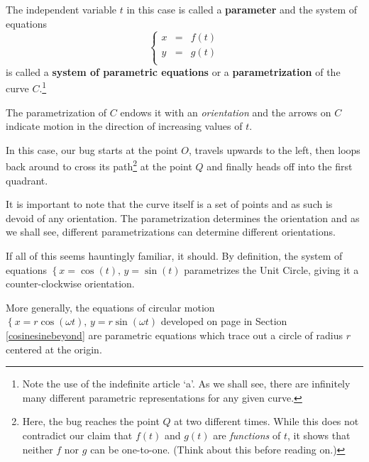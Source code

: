 \documentclass{ximera}
\begin{document}
\smallskip

The independent variable $t$ in this case is called a  \textbf{parameter} and the system of equations \[\left\{ \begin{array}{rcl} x & = & f(t) \\ y & = & g(t) \\ \end{array} \right.\] is called a  \textbf{system of parametric equations} or a  \textbf{parametrization} of the curve $C$.\footnote{Note the use of the indefinite article `a'.  As we shall see, there are infinitely many different parametric representations for any given curve.}   

\smallskip

The parametrization of $C$ endows it with an  \textit{orientation} and the arrows on $C$ indicate motion in the direction of increasing values of $t$. 

\smallskip

In this case, our bug starts at the point $O$, travels upwards to the left, then loops back around to cross its path\footnote{Here, the bug reaches the point $Q$ at two different times. While this does not contradict our claim that $f(t)$ and $g(t)$ are \textit{functions} of $t$, it shows that neither $f$ nor $g$ can be one-to-one.  (Think about this before reading on.)} at the point $Q$ and finally heads off into the first quadrant. 

\smallskip

  It is important to note that the curve itself is a set of points and as such is devoid of any orientation.  The parametrization determines the orientation and as we shall see, different parametrizations can determine different orientations. 
  
  \smallskip
  
  If all of this seems hauntingly familiar, it should.  By definition, the system of equations $\left\{ x = \cos(t), \, y = \sin(t) \right.$ parametrizes the Unit Circle, giving it a counter-clockwise orientation.  
  
  \smallskip
  
  More generally, the equations of circular motion $\left\{ x = r\cos(\omega t), \, y = r\sin(\omega t) \right.$ developed on page \pageref{equationsforcircularmotion} in Section \ref{cosinesinebeyond} are parametric equations which trace out a circle of radius $r$ centered at the origin. 
  
\end{document}
